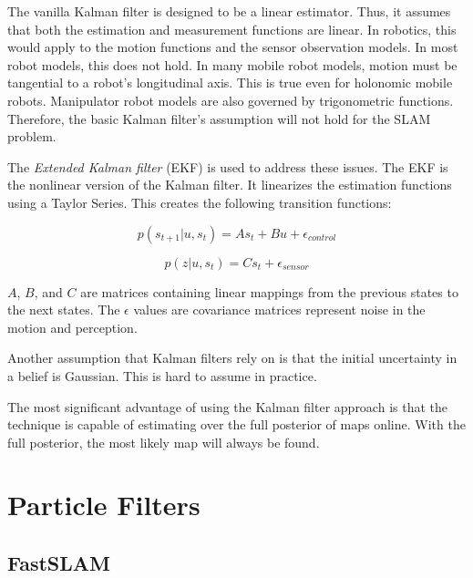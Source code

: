 \documentclass[10pt,conference]{ieeeconf}
\begin{document}
    The vanilla Kalman filter is designed to be a linear estimator. Thus, it assumes that both the estimation and measurement functions are linear. In robotics, this would apply to the motion functions and the sensor observation models. In most robot models, this does not hold. In many mobile robot models, motion must be tangential to a robot's longitudinal axis. This is true even for holonomic mobile robots. Manipulator robot models are also governed by trigonometric functions. Therefore, the basic Kalman filter's assumption will not hold for the SLAM problem.
    
    
    The \emph{Extended Kalman filter} (EKF) is used to address these issues. The EKF is the nonlinear version of the Kalman filter. It linearizes the estimation functions using a Taylor Series. This creates the following transition functions:
    
    \begin{equation}
    p(s_{t+1}|u,s_t) = As_t+Bu+\epsilon_{control}
    \label{nlm}
    \end{equation}
    
    \begin{equation}
    p(z|u,s_t) = Cs_t+\epsilon_{sensor}
    \label{nls}
    \end{equation}
    
	$A$, $B$, and $C$ are matrices containing linear mappings from the previous states to the next states. The $\epsilon$ values are covariance matrices represent noise in the motion and perception.
	
	Another assumption that Kalman filters rely on is that the initial uncertainty in a belief is Gaussian. This is hard to assume in practice. 



    	The most significant advantage of using the Kalman filter approach is that the technique is capable of estimating over the full posterior of maps online. With the full posterior, the most likely map will always be found. 



\section {Particle Filters}

	

	
	\subsection{FastSLAM}
	
\end{document}
